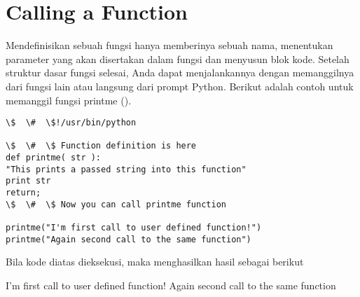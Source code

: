 \section{Calling a Function} 
Mendefinisikan sebuah fungsi hanya memberinya sebuah nama, menentukan parameter yang akan disertakan dalam fungsi dan menyusun blok kode. Setelah struktur dasar fungsi selesai, Anda dapat menjalankannya dengan memanggilnya dari fungsi lain atau langsung dari prompt Python. Berikut adalah contoh untuk memanggil fungsi printme ().
\begin{verbatim}
\$  \#  \$!/usr/bin/python 

\$  \#  \$ Function definition is here
def printme( str ): 
"This prints a passed string into this function" 
print str
return; 
\$  \#  \$ Now you can call printme function

printme("I'm first call to user defined function!")
printme("Again second call to the same function") 
\end{verbatim}
Bila kode diatas dieksekusi, maka menghasilkan hasil sebagai berikut 

I'm first call to user defined function! 
Again second call to the same function 

